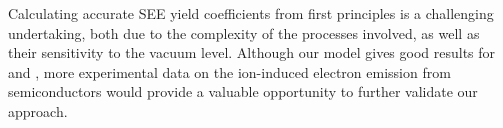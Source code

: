\begin{refsection}
Calculating accurate SEE yield coefficients from first principles is a challenging undertaking, both due to the complexity of the processes involved, as well as their sensitivity to the vacuum level. Although our model gives good results for  and , more experimental data on the ion-induced electron emission from semiconductors would provide a valuable opportunity to further validate our approach.  \\

\printbibliography
\end{refsection}